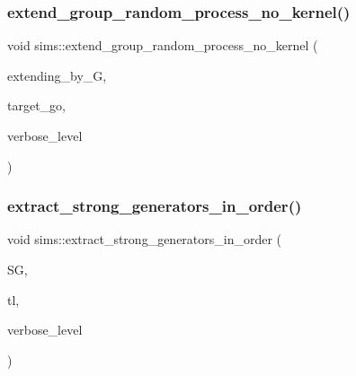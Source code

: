 \subsubsection{\texorpdfstring{extend\+\_\+group\+\_\+random\+\_\+process\+\_\+no\+\_\+kernel()}{extend\_group\_random\_process\_no\_kernel()}}
{\footnotesize\ttfamily void sims\+::extend\+\_\+group\+\_\+random\+\_\+process\+\_\+no\+\_\+kernel (\begin{DoxyParamCaption}\item[{\mbox{\hyperlink{classsims}{sims}} $\ast$}]{extending\+\_\+by\+\_\+G,  }\item[{\mbox{\hyperlink{classlonginteger__object}{longinteger\+\_\+object}} \&}]{target\+\_\+go,  }\item[{\mbox{\hyperlink{galois_8h_a09fddde158a3a20bd2dcadb609de11dc}{I\+NT}}}]{verbose\+\_\+level }\end{DoxyParamCaption})}

\mbox{\label{classsims_aeaf4ae6bb916342a66470730af69923a}} 
\subsubsection{\texorpdfstring{extract\+\_\+strong\+\_\+generators\+\_\+in\+\_\+order()}{extract\_strong\_generators\_in\_order()}}
{\footnotesize\ttfamily void sims\+::extract\+\_\+strong\+\_\+generators\+\_\+in\+\_\+order (\begin{DoxyParamCaption}\item[{\mbox{\hyperlink{classvector__ge}{vector\+\_\+ge}} \&}]{SG,  }\item[{\mbox{\hyperlink{galois_8h_a09fddde158a3a20bd2dcadb609de11dc}{I\+NT}} $\ast$}]{tl,  }\item[{\mbox{\hyperlink{galois_8h_a09fddde158a3a20bd2dcadb609de11dc}{I\+NT}}}]{verbose\+\_\+level }\end{DoxyParamCaption})}

\mbox{\label{classsims_a2747368b290225e639103bff8e32ffc9}} 
